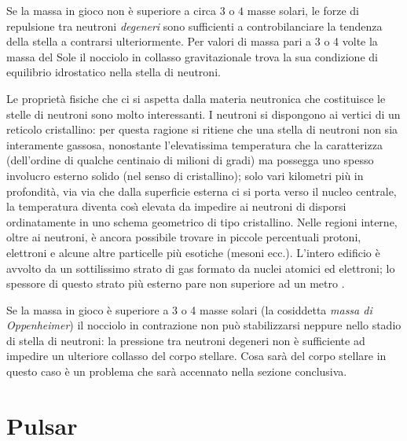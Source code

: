Se la massa in gioco non è superiore a circa $3$ o $4$  masse solari, le forze di repulsione tra neutroni \emph{degeneri} sono sufficienti a controbilanciare la tendenza della stella a contrarsi ulteriormente. Per valori di massa pari a 3 o 4 volte la massa del Sole il nocciolo in collasso gravitazionale trova la sua condizione di equilibrio idrostatico nella stella di neutroni.
\par
Le propriet\`{a} fisiche che ci si aspetta dalla materia neutronica che costituisce le stelle di neutroni sono molto interessanti. I neutroni si dispongono ai vertici di un reticolo cristallino: per questa ragione si ritiene che una stella di neutroni non sia interamente gassosa, nonostante l'elevatissima temperatura che la caratterizza (dell'ordine di qualche centinaio di milioni di gradi) ma possegga uno spesso involucro esterno solido (nel senso di cristallino); solo vari kilometri più in profondit\`{a}, via via che dalla superficie esterna ci si porta verso il nucleo centrale, la temperatura diventa cos\`{\i}{} elevata da impedire ai neutroni di disporsi ordinatamente in uno schema geometrico  di tipo cristallino. Nelle regioni interne, oltre ai neutroni, è ancora possibile trovare in piccole percentuali protoni, elettroni  e alcune altre particelle più esotiche (mesoni ecc.). L'intero edificio è avvolto da un sottilissimo strato di gas formato da nuclei atomici ed elettroni; lo spessore di questo strato più esterno pare non superiore ad un metro \Cite{rosino}.
\par
Se la massa in gioco è superiore a 3 o 4 masse solari (la cosiddetta \emph{massa di Oppenheimer}) il nocciolo in contrazione non può stabilizzarsi neppure nello stadio di stella di neutroni: la pressione tra neutroni degeneri non è sufficiente ad impedire un ulteriore collasso del corpo stellare. Cosa sar\`{a} del corpo stellare in questo caso è un problema che sar\`{a} accennato nella sezione conclusiva.
\section{Pulsar}\label{pulsar}
